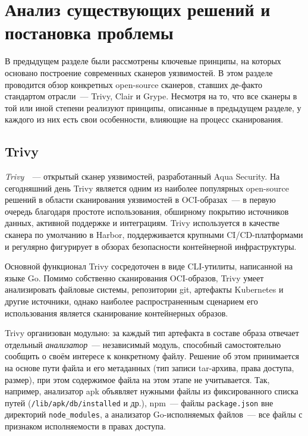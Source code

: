 \section{Анализ существующих решений и постановка проблемы}
\label{sec:Chapter3} 

В предыдущем разделе были рассмотрены ключевые принципы, на которых основано построение современных сканеров уязвимостей. В этом разделе проводится обзор конкретных open-source сканеров, ставших де-факто стандартом отрасли~--- Trivy, Clair и Grype. Несмотря на то, что все сканеры в той или иной степени реализуют принципы, описанные в предыдущем разделе, у каждого из них есть свои особенности, влияющие на процесс сканирования.

\subsection{Trivy}

\textit{Trivy}~\cite{trivy}~--- открытый сканер уязвимостей, разработанный Aqua Security. На сегодняшний день Trivy является одним из наиболее популярных open-source решений в области сканирования уязвимостей в OCI-образах~--- в первую очередь благодаря простоте использования, обширному покрытию источников данных, активной поддержке и интеграциям. Trivy используется в качестве сканера по умолчанию в Harbor, поддерживается крупными CI/CD-платформами и регулярно фигурирует в обзорах безопасности контейнерной инфраструктуры.

Основной функционал Trivy сосредоточен в виде CLI-утилиты, написанной на языке Go. Помимо собственно сканирования OCI-образов, Trivy умеет анализировать файловые системы, репозитории git, артефакты Kubernetes и другие источники, однако наиболее распространенным сценарием его использования является сканирование контейнерных образов.

Trivy организован модульно: за каждый тип артефакта в составе образа отвечает отдельный \textit{анализатор}~--- независимый модуль, способный самостоятельно сообщить о своём интересе к конкретному файлу. Решение об этом принимается на основе пути файла и его метаданных (тип записи tar-архива, права доступа, размер), при этом содержимое файла на этом этапе не учитывается. Так, например, анализатор apk объявляет нужными файлы из фиксированного списка путей (\texttt{/lib/apk/db/installed} и др.), npm~--- файлы \texttt{package.json} вне директорий \texttt{node\_modules}, а анализатор Go-исполняемых файлов~--- все файлы с признаком исполняемости в правах доступа.

